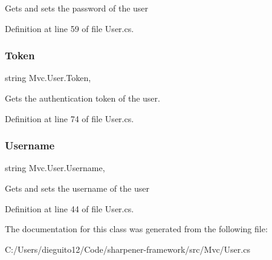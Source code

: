 Gets and sets the password of the user 



Definition at line 59 of file User.\+cs.

\mbox{\label{class_mvc_1_1_user_a03f1acccda5ea5fd895526a53478c130}} 
\subsubsection{\texorpdfstring{Token}{Token}}
{\footnotesize\ttfamily string Mvc.\+User.\+Token\hspace{0.3cm}{\ttfamily [get]}, {\ttfamily [set]}}



Gets the authentication token of the user. 



Definition at line 74 of file User.\+cs.

\mbox{\label{class_mvc_1_1_user_a14126ed3932866cb7a0ab76ea3f79125}} 
\subsubsection{\texorpdfstring{Username}{Username}}
{\footnotesize\ttfamily string Mvc.\+User.\+Username\hspace{0.3cm}{\ttfamily [get]}, {\ttfamily [set]}}



Gets and sets the username of the user 



Definition at line 44 of file User.\+cs.



The documentation for this class was generated from the following file\+:\begin{DoxyCompactItemize}
\item 
C\+:/\+Users/dieguito12/\+Code/sharpener-\/framework/src/\+Mvc/User.\+cs\end{DoxyCompactItemize}
